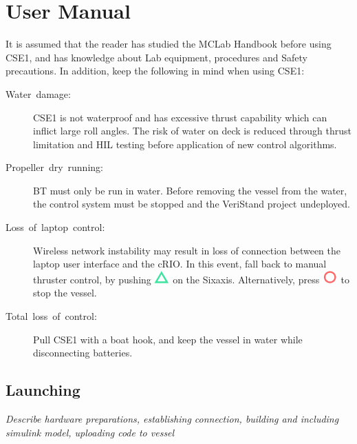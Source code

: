 \part{User Manual}\label{part2}
\noindent
It is assumed that the reader has studied the MCLab Handbook before using CSE1, and has knowledge about Lab equipment, procedures and Safety precautions. In addition, keep the following in mind when using CSE1:
\begin{description}
	\item [{Water~damage:}] CSE1 is not waterproof and has excessive thrust capability which can inflict large roll angles. The risk of water on deck is reduced through thrust limitation and HIL testing before application of new control algorithms. 
	\item [{Propeller~dry~running:}] BT must only be run in water. Before removing the vessel from the water, the control system must be stopped and the VeriStand project undeployed.
	\item [{Loss~of~laptop~control:}] Wireless network instability may result in loss of connection between the laptop user interface and the cRIO. In this event, fall back to manual thruster control, by pushing \includegraphics[scale=0.4]{fig/sixaxis_triangle} on the Sixaxis. Alternatively, press \includegraphics[scale=0.4]{fig/sixaxis_circle} to stop the vessel.
	\item [{Total~loss~of~control:}] Pull CSE1 with a boat hook, and keep the vessel in water while disconnecting batteries.
\end{description}
\chapter{Launching}
\textit{Describe hardware preparations, establishing connection, building and including simulink model, uploading code to vessel}

